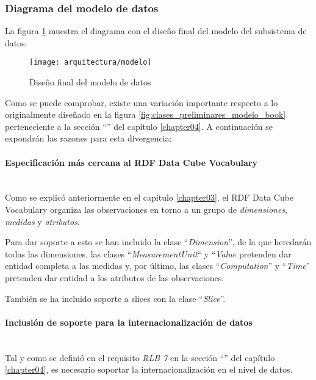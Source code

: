 \subsubsection{Diagrama del modelo de datos}
La figura \ref{fig:diagrama_modelo_final} muestra el diagrama con el diseño final del modelo del subsistema de datos.
\begin{landscape}
	\begin{figure}[h]
		\centering
		\texttt{[image: arquitectura/modelo]}
		\caption{Diseño final del modelo de datos}
		\label{fig:diagrama_modelo_final}
	\end{figure}
\end{landscape}

Como se puede comprobar, existe una variación importante respecto a lo originalmente diseñado en la figura \ref{fig:clases_preliminares_modelo_book} perteneciente a la sección ``'' del capítulo \ref{chapter04}.  A continuación se expondrán las razones para esta divergencia:

\paragraph{Especificación más cercana al RDF Data Cube Vocabulary} \hfill \\
Como se explicó anteriormente en el capítulo \ref{chapter03}, el RDF Data Cube Vocabulary organiza las observaciones en torno a un grupo de \textit{dimensiones}, \textit{medidas} y \textit{atributos}.

Para dar soporte a esto se han incluido la clase ``\textit{Dimension}'', de la que heredarán todas las dimensiones, las clases ``\textit{MeasurementUnit}`` y ``\textit{Value} pretenden dar entidad completa a las medidas y, por último, las clases ``\textit{Computation}'' y ``\textit{Time}'' pretenden dar entidad a los atributos de las observaciones.

También se ha incluido soporte a slices con la clase ``\textit{Slice}''.

\paragraph{Inclusión de soporte para la internacionalización de datos} \hfill \\
Tal y como se definió en el requisito \textit{RLB 7} en la sección ``'' del capítulo \ref{chapter04}, es necesario soportar la internacionalización en el nivel de datos.

